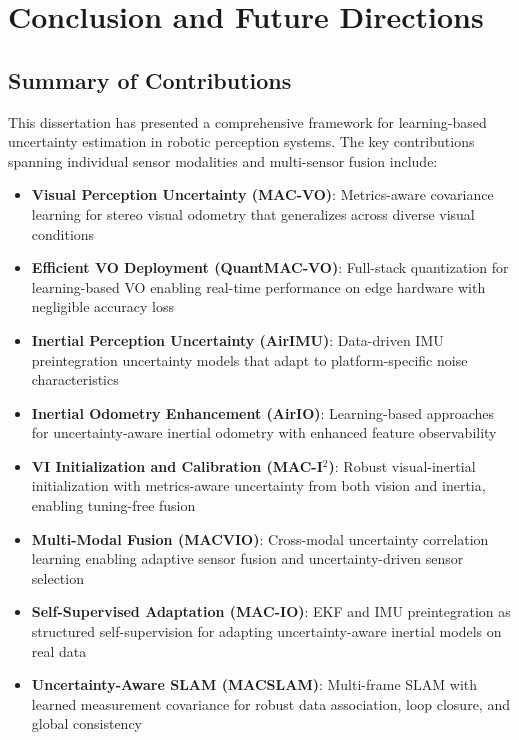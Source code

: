 \chapter{Conclusion and Future Directions} \label{chapter:conclusion}

\section{Summary of Contributions}

This dissertation has presented a comprehensive framework for learning-based uncertainty estimation in robotic perception systems. The key contributions spanning individual sensor modalities and multi-sensor fusion include:

\begin{itemize}
    \item \textbf{Visual Perception Uncertainty (MAC-VO)}: Metrics-aware covariance learning for stereo visual odometry that generalizes across diverse visual conditions
    \item \textbf{Efficient VO Deployment (QuantMAC-VO)}: Full-stack quantization for learning-based VO enabling real-time performance on edge hardware with negligible accuracy loss
    \item \textbf{Inertial Perception Uncertainty (AirIMU)}: Data-driven IMU preintegration uncertainty models that adapt to platform-specific noise characteristics
    \item \textbf{Inertial Odometry Enhancement (AirIO)}: Learning-based approaches for uncertainty-aware inertial odometry with enhanced feature observability
    \item \textbf{VI Initialization and Calibration (MAC-I$^2$)}: Robust visual-inertial initialization with metrics-aware uncertainty from both vision and inertia, enabling tuning-free fusion
    \item \textbf{Multi-Modal Fusion (MACVIO)}: Cross-modal uncertainty correlation learning enabling adaptive sensor fusion and uncertainty-driven sensor selection
    \item \textbf{Self-Supervised Adaptation (MAC-IO)}: EKF and IMU preintegration as structured self-supervision for adapting uncertainty-aware inertial models on real data
    \item \textbf{Uncertainty-Aware SLAM (MACSLAM)}: Multi-frame SLAM with learned measurement covariance for robust data association, loop closure, and global consistency
\end{itemize}

